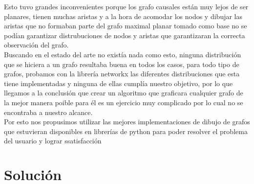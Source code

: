 \documentclass[spanish]{article}
\begin{document}
Esto tuvo grandes inconvenientes porque los grafo causales están muy lejos de ser planares, tienen muchas aristas y a la hora de acomodar los nodos y dibujar las aristas que no formaban parte del grafo maximal planar tomado como base no se podían garantizar distrubuciones de nodos y aristas que garantizaran la correcta observación del grafo.\\

Buscando en el estado del arte no existía nada como esto, ninguna distribución que se hiciera a un grafo resultaba buena en todos los casos, para todo tipo de grafos, probamos con la librería networkx las diferentes distribuciones que esta tiene implementadas y ninguna de ellas cumplía nuestro objetivo, por lo que llegamos a la conclusión que crear un algoritmo que graficara cualquier grafo de la mejor manera poible para él es un ejercicio muy complicado por lo cual no se encontraba a nuestro alcance.\\

Por esto nos propusimos utilizar las mejores implementaciones de dibujo de grafos que estuvieran disponibles en librerías de python para poder resolver el problema del usuario y lograr ssatisfacción\\


\section*{Solución}
\end{document}
